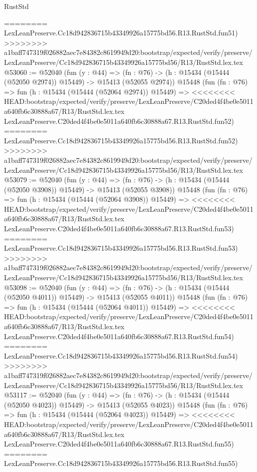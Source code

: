 \begin{lexlean}{RustStd}
\begin{coremodule}
{\begin{coremodule}
{{{{{{{{{{{{{{{{{{{{{{{{{{{{{{{{{{{{{{{{{{{{{{{{{{{{{{{{{{{{========
    LexLeanPreserve.Cc18d942836715b43349926a15775bd56.R13.RustStd.fun51)
>>>>>>>> a1baff747319f026882aec7e84382c8619949d20:bootstrap/expected/verify/preserve/LexLeanPreserve/Cc18d942836715b43349926a15775bd56/R13/RustStd.lex.tex
@53060 := @52040
    (fun (y : @44) =>
    (fn : @76) -> (h : @15434 (@15444 (@52050 @2974)) @15449) -> @15413 (@52055 @2974))
    @15448
    (fun (fn : @76) =>
    fun (h : @15434 (@15444 (@52064 @2974)) @15449) =>
<<<<<<<< HEAD:bootstrap/expected/verify/preserve/LexLeanPreserve/C20ded4f4be0e5011a640fb6c30888a67/R13/RustStd.lex.tex
    LexLeanPreserve.C20ded4f4be0e5011a640fb6c30888a67.R13.RustStd.fun52)
========
    LexLeanPreserve.Cc18d942836715b43349926a15775bd56.R13.RustStd.fun52)
>>>>>>>> a1baff747319f026882aec7e84382c8619949d20:bootstrap/expected/verify/preserve/LexLeanPreserve/Cc18d942836715b43349926a15775bd56/R13/RustStd.lex.tex
@53079 := @52040
    (fun (y : @44) =>
    (fn : @76) -> (h : @15434 (@15444 (@52050 @3908)) @15449) -> @15413 (@52055 @3908))
    @15448
    (fun (fn : @76) =>
    fun (h : @15434 (@15444 (@52064 @3908)) @15449) =>
<<<<<<<< HEAD:bootstrap/expected/verify/preserve/LexLeanPreserve/C20ded4f4be0e5011a640fb6c30888a67/R13/RustStd.lex.tex
    LexLeanPreserve.C20ded4f4be0e5011a640fb6c30888a67.R13.RustStd.fun53)
========
    LexLeanPreserve.Cc18d942836715b43349926a15775bd56.R13.RustStd.fun53)
>>>>>>>> a1baff747319f026882aec7e84382c8619949d20:bootstrap/expected/verify/preserve/LexLeanPreserve/Cc18d942836715b43349926a15775bd56/R13/RustStd.lex.tex
@53098 := @52040
    (fun (y : @44) =>
    (fn : @76) -> (h : @15434 (@15444 (@52050 @4011)) @15449) -> @15413 (@52055 @4011))
    @15448
    (fun (fn : @76) =>
    fun (h : @15434 (@15444 (@52064 @4011)) @15449) =>
<<<<<<<< HEAD:bootstrap/expected/verify/preserve/LexLeanPreserve/C20ded4f4be0e5011a640fb6c30888a67/R13/RustStd.lex.tex
    LexLeanPreserve.C20ded4f4be0e5011a640fb6c30888a67.R13.RustStd.fun54)
========
    LexLeanPreserve.Cc18d942836715b43349926a15775bd56.R13.RustStd.fun54)
>>>>>>>> a1baff747319f026882aec7e84382c8619949d20:bootstrap/expected/verify/preserve/LexLeanPreserve/Cc18d942836715b43349926a15775bd56/R13/RustStd.lex.tex
@53117 := @52040
    (fun (y : @44) =>
    (fn : @76) -> (h : @15434 (@15444 (@52050 @4023)) @15449) -> @15413 (@52055 @4023))
    @15448
    (fun (fn : @76) =>
    fun (h : @15434 (@15444 (@52064 @4023)) @15449) =>
<<<<<<<< HEAD:bootstrap/expected/verify/preserve/LexLeanPreserve/C20ded4f4be0e5011a640fb6c30888a67/R13/RustStd.lex.tex
    LexLeanPreserve.C20ded4f4be0e5011a640fb6c30888a67.R13.RustStd.fun55)
========
    LexLeanPreserve.Cc18d942836715b43349926a15775bd56.R13.RustStd.fun55)
}}}}}}}}}}}}}}}}}}}}}}}}}}}}}}}}}}}}}}}}}}}}}}}}}}}}}}}}}}}}
\end{coremodule}}
\end{coremodule}
\end{lexlean}

